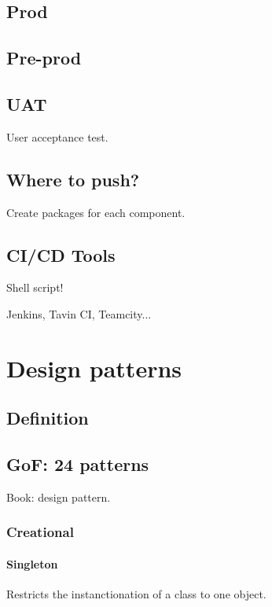 \documentclass[a4paper,11pt]{article}
\begin{document}
\subsection{Prod}

\subsection{Pre-prod}

\subsection{UAT}

User acceptance test.

\subsection{Where to push?}

Create packages for each component.

\subsection{CI/CD Tools}

Shell script!

Jenkins, Tavin CI, Teamcity...

\section{Design patterns}

\subsection{Definition}

\subsection{GoF: 24 patterns}

Book: design pattern.

\subsubsection{Creational}

\paragraph{Singleton}

Restricts the instanctionation of a class to one object.
\end{document}
